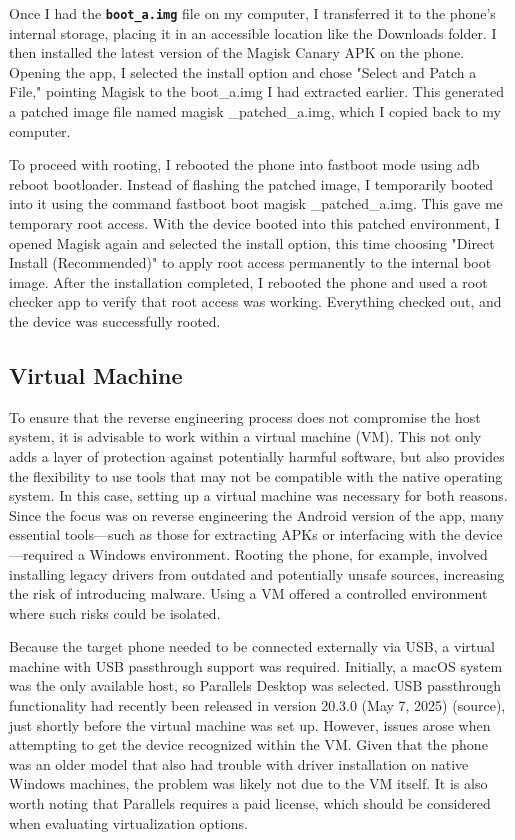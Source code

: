 Once I had the \textbf{\texttt{boot\_a.img}} file on my computer, I transferred it to the phone’s internal storage, placing it in an accessible location like the Downloads folder. I then installed the latest version of the Magisk Canary APK on the phone. Opening the app, I selected the install option and chose "Select and Patch a File," pointing Magisk to the boot\_a.img I had extracted earlier. This generated a patched image file named magisk \_patched\_a.img, which I copied back to my computer.

To proceed with rooting, I rebooted the phone into fastboot mode using adb reboot bootloader. Instead of flashing the patched image, I temporarily booted into it using the command fastboot boot magisk \_patched\_a.img. This gave me temporary root access. With the device booted into this patched environment, I opened Magisk again and selected the install option, this time choosing "Direct Install (Recommended)" to apply root access permanently to the internal boot image.
After the installation completed, I rebooted the phone and used a root checker app to verify that root access was working. Everything checked out, and the device was successfully rooted.

\subsection{Virtual Machine}
To ensure that the reverse engineering process does not compromise the host system, it is advisable to work within a virtual machine (VM). This not only adds a layer of protection against potentially harmful software, but also provides the flexibility to use tools that may not be compatible with the native operating system. In this case, setting up a virtual machine was necessary for both reasons.
Since the focus was on reverse engineering the Android version of the app, many essential tools—such as those for extracting APKs or interfacing with the device—required a Windows environment. Rooting the phone, for example, involved installing legacy drivers from outdated and potentially unsafe sources, increasing the risk of introducing malware. Using a VM offered a controlled environment where such risks could be isolated.

Because the target phone needed to be connected externally via USB, a virtual machine with USB passthrough support was required. Initially, a macOS system was the only available host, so Parallels Desktop was selected. USB passthrough functionality had recently been released in version 20.3.0 (May 7, 2025) (source), just shortly before the virtual machine was set up. However, issues arose when attempting to get the device recognized within the VM. Given that the phone was an older model that also had trouble with driver installation on native Windows machines, the problem was likely not due to the VM itself. It is also worth noting that Parallels requires a paid license, which should be considered when evaluating virtualization options.

